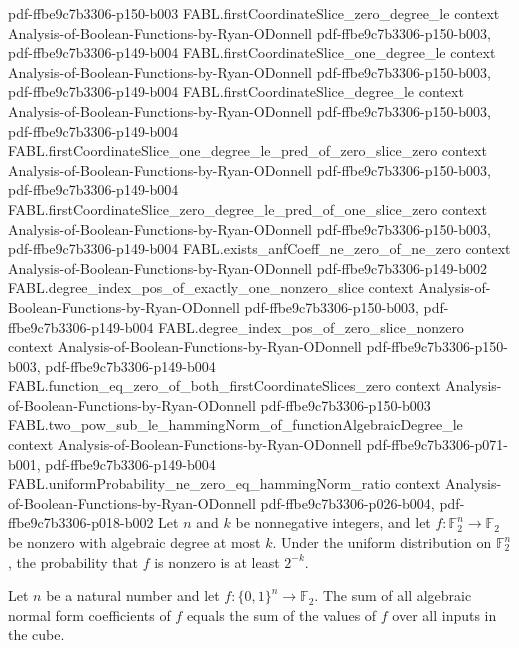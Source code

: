 \begin{theorem}
  {pdf-ffbe9c7b3306-p150-b003}
\proofstep
  {FABL.firstCoordinateSlice_zero_degree_le}
  {context}
  {Analysis-of-Boolean-Functions-by-Ryan-ODonnell}
  {pdf-ffbe9c7b3306-p150-b003,
    pdf-ffbe9c7b3306-p149-b004}
\proofstep
  {FABL.firstCoordinateSlice_one_degree_le}
  {context}
  {Analysis-of-Boolean-Functions-by-Ryan-ODonnell}
  {pdf-ffbe9c7b3306-p150-b003,
    pdf-ffbe9c7b3306-p149-b004}
\proofstep
  {FABL.firstCoordinateSlice_degree_le}
  {context}
  {Analysis-of-Boolean-Functions-by-Ryan-ODonnell}
  {pdf-ffbe9c7b3306-p150-b003,
    pdf-ffbe9c7b3306-p149-b004}
\proofstep
  {FABL.firstCoordinateSlice_one_degree_le_pred_of_zero_slice_zero}
  {context}
  {Analysis-of-Boolean-Functions-by-Ryan-ODonnell}
  {pdf-ffbe9c7b3306-p150-b003,
    pdf-ffbe9c7b3306-p149-b004}
\proofstep
  {FABL.firstCoordinateSlice_zero_degree_le_pred_of_one_slice_zero}
  {context}
  {Analysis-of-Boolean-Functions-by-Ryan-ODonnell}
  {pdf-ffbe9c7b3306-p150-b003,
    pdf-ffbe9c7b3306-p149-b004}
\proofstep
  {FABL.exists_anfCoeff_ne_zero_of_ne_zero}
  {context}
  {Analysis-of-Boolean-Functions-by-Ryan-ODonnell}
  {pdf-ffbe9c7b3306-p149-b002}
\proofstep
  {FABL.degree_index_pos_of_exactly_one_nonzero_slice}
  {context}
  {Analysis-of-Boolean-Functions-by-Ryan-ODonnell}
  {pdf-ffbe9c7b3306-p150-b003,
    pdf-ffbe9c7b3306-p149-b004}
\proofstep
  {FABL.degree_index_pos_of_zero_slice_nonzero}
  {context}
  {Analysis-of-Boolean-Functions-by-Ryan-ODonnell}
  {pdf-ffbe9c7b3306-p150-b003,
    pdf-ffbe9c7b3306-p149-b004}
\proofstep
  {FABL.function_eq_zero_of_both_firstCoordinateSlices_zero}
  {context}
  {Analysis-of-Boolean-Functions-by-Ryan-ODonnell}
  {pdf-ffbe9c7b3306-p150-b003}
\proofstep
  {FABL.two_pow_sub_le_hammingNorm_of_functionAlgebraicDegree_le}
  {context}
  {Analysis-of-Boolean-Functions-by-Ryan-ODonnell}
  {pdf-ffbe9c7b3306-p071-b001,
    pdf-ffbe9c7b3306-p149-b004}
\proofstep
  {FABL.uniformProbability_ne_zero_eq_hammingNorm_ratio}
  {context}
  {Analysis-of-Boolean-Functions-by-Ryan-ODonnell}
  {pdf-ffbe9c7b3306-p026-b004,
    pdf-ffbe9c7b3306-p018-b002}
Let $n$ and $k$ be nonnegative integers, and let $f:\mathbb F_2^n\to\mathbb F_2$ be
nonzero with algebraic degree at most $k$. Under the uniform distribution on $\mathbb
F_2^n$, the probability that $f$ is nonzero is at least $2^{-k}$.
\end{theorem}

\begin{theorem}
\leanok
{}
Let $n$ be a natural number and let $f:\{0,1\}^n\to\mathbb F_2$. The sum of all
algebraic normal form coefficients of $f$ equals the sum of the values of $f$ over all
inputs in the cube.
\end{theorem}

